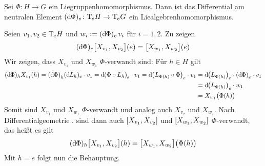 \begin{lemma}[label=lem:122,{name=[{Differntial von Liegruppenhom. ist Liealgebrenhom.}]}]
	Sei $\Phi \colon H \to G$ ein Liegruppenhomomorphismus.
	Dann ist das Differential am neutralen Element $(\mathd\Phi)_e \colon \Tmap_e H \to \Tmap_e G$ ein Liealgebrenhomomorphismus.
\end{lemma}
\begin{beweis}
	Seien $v_1,v_2 \in \Tmap_e H$ und $w_i := (\mathd \Phi)_e \, v_i$ für $i=1,2$.
	Zu zeigen
	\[
		(\mathd \Phi)_e \benbrace[\big]{X_{v_1}, X_{v_2}} (e) = \benbrace[\big]{X_{w_1},X_{w_2}}(e)
	\]
	Wir zeigen, dass $X_{v_1}$ und $X_{w_1}$ $\Phi$-verwandt sind: Für $h \in H$ gilt
	\begin{align}
		(\mathd \Phi)_h X_{v_1}(h) = \enbrace*{\mathd \Phi}_h (\mathd L_h)_e \cdot v_1 = \mathd \enbrace*{\Phi \circ L_h}_e \cdot v_1 
		= \mathd \enbrace*{L_{\Phi(h)} \circ \Phi}_e \cdot v_1 
		&= \mathd \enbrace*{L_{\Phi(h)}}_e \cdot \enbrace*{\mathd \Phi}_e \cdot v_1 \\
		&= \mathd \enbrace*{L_{\Phi(h)}}_e \cdot w_1 \\
		&= X_{w_1}\enbrace[\big]{\Phi(h)}
	\end{align}
	Somit sind $X_{v_1}$ und $X_{w_1}$ $\Phi$-verwandt und analog auch $X_{v_2}$ und $X_{w_2}$.
	Nach Differentialgeometrie . sind dann auch $\benbrace*{X_{v_1}, X_{v_2}}$ und $\benbrace*{X_{w_1},X_{w_2}}$ $\Phi$-verwandt, das heißt es gilt
	\[
		(\mathd \Phi)_h \benbrace[\big]{X_{v_1},X_{v_2}}(h) = \benbrace[\big]{X_{w_1}, X_{w_2}} \enbrace[\big]{\Phi(h)}
	\]
	Mit $h=e$ folgt nun die Behauptung.
\end{beweis}

